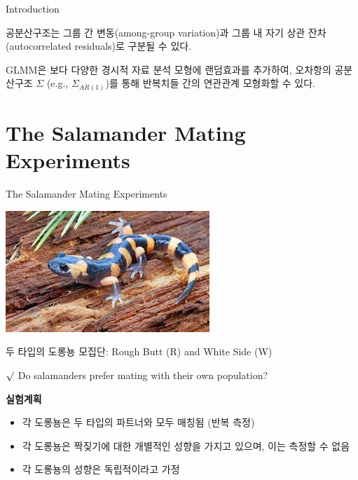\documentclass[9pt, xelatex]{beamer}
\begin{document}
{\begin{frame}[allowframebreaks]{Introduction}
\begin{itemize}
			공분산구조는 그룹 간 변동(among-group variation)과 그룹 내 자기 상관 잔차(autocorrelated residuals)로 구분될 수 있다.
			\vspace{2mm}
			
			GLMM은 보다 다양한 경시적 자료 분석 모형에 랜덤효과를 추가하여, 오차항의 공분산구조 $\Sigma$ (e.g., $\Sigma_{AR(1)}$)를 통해 반복치들 간의 연관관계 모형화할 수 있다.
			
	\end{itemize}	
	\end{frame}
}


\section{The Salamander Mating Experiments}{
	\begin{frame}[allowframebreaks]{The Salamander Mating Experiments}
		\begin{center}
		\graphicspath{ {./} }
		\includegraphics[scale=0.6]{sal}
		\vspace{4mm}
		
		두 타입의 도롱뇽 모집단: Rough Butt (R) and White Side (W)
		\vspace{3mm}
		
		$\surd$ Do salamanders prefer mating with their own population?
		\end{center}
		
		
	    \pagebreak
		
	    
		\textbf{실험계획} \\
		\vspace{4mm}
		\begin{itemize}
			\item 각 도롱뇽은 두 타입의 파트너와 모두 매칭됨 (반복 측정)
			\vspace{2mm}
			 \item 각 도롱뇽은 짝짖기에 대한 개별적인 성향을 가지고 있으며, 이는 측정할 수 없음
			\vspace{2mm}
			 \item 각 도롱뇽의 성향은 독립적이라고 가정
			\vspace{4mm}
			 

\end{itemize}
\end{frame}}
\end{document}
